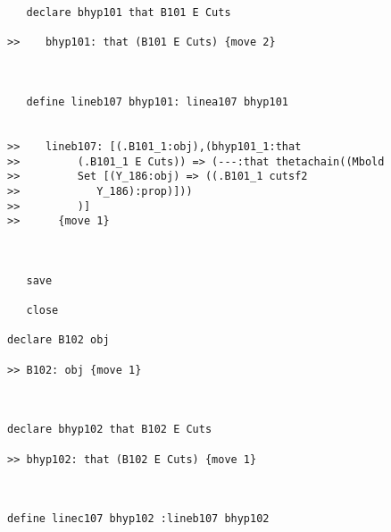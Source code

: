 \documentclass[12pt]{article}
\begin{document}
\begin{verbatim}
   declare bhyp101 that B101 E Cuts

>>    bhyp101: that (B101 E Cuts) {move 2}



   define lineb107 bhyp101: linea107 bhyp101


>>    lineb107: [(.B101_1:obj),(bhyp101_1:that
>>         (.B101_1 E Cuts)) => (---:that thetachain((Mbold
>>         Set [(Y_186:obj) => ((.B101_1 cutsf2
>>            Y_186):prop)]))
>>         )]
>>      {move 1}



   save

   close

declare B102 obj

>> B102: obj {move 1}



declare bhyp102 that B102 E Cuts

>> bhyp102: that (B102 E Cuts) {move 1}



define linec107 bhyp102 :lineb107 bhyp102



\end{verbatim}
\end{document}
